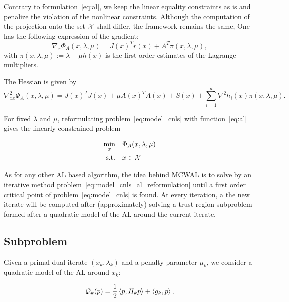 \documentclass[10pt]{article}
\numberwithin{equation}{section}
\begin{document}
	 Contrary to formulation~\eqref{eq:al}, we keep the linear equality constraints as is and penalize the violation of the nonlinear constraints. Although the computation of the projection onto the set ${\mathcal{X}}$ shall differ, the framework remains the same, 
	 One has the following expression of the gradient: 
	 \begin{equation}
	 	\label{eq:al_grad}
	 	\nabla_x \Phi_A(x,\lambda,\mu) = J(x)^Tr(x) + A^T\pi(x,\lambda,\mu),
	 \end{equation}
	 with $\pi(x,\lambda,\mu):=\lambda + \mu h(x)$ is the first-order estimates of the Lagrange multipliers. 
	 
	 The Hessian is given by
	 \begin{equation}\label{eq:al_hessian}
	 	\nabla^2_{xx} \Phi_A(x,\lambda,\mu) = J(x)^TJ(x) + \mu A(x)^TA(x) +  S(x) + \sum_{i=1}^d \nabla^2 h_i(x) \pi(x,\lambda,\mu).
	 \end{equation}
	 
	 For fixed $\lambda$ and $\mu$, reformulating problem~\eqref{eq:model_cnls} with function~\eqref{eq:al} gives the linearly constrained problem
	 
	 \begin{equation}\label{eq:model_cnls_al_reformulation} 
	 	\begin{aligned}
	 		\min_{x} \quad& \Phi_A(x,\lambda,\mu)  \\
	 		\text{s.t.}  \quad & x \in {\mathcal{X}} 
	 	\end{aligned}	
	 \end{equation}
	 
	 As for any other AL based algorithm, the idea behind MCWAL is to solve by an iterative method problem~\eqref{eq:model_cnls_al_reformulation} until a first order critical point of problem~\eqref{eq:model_cnls} is found. At every iteration, a the new iterate will be computed after (approximately) solving a trust region subproblem formed after a quadratic model of the AL around the current iterate. 
	 
	 \subsection{Subproblem}
	 
	 Given a primal-dual iterate $(x_k,\lambda_k)$ and a penalty parameter $\mu_k$, we consider a quadratic model of the AL around $x_k$:
	 
	 \begin{equation}\label{eq:quadratic_al}
	 	{\mathcal{Q}}_k(p) = \dfrac{1}{2}\left\langle {p} , {H_kp} \right\rangle + \left\langle {g_k} , {p} \right\rangle,
	 \end{equation}
	 
\end{document}
